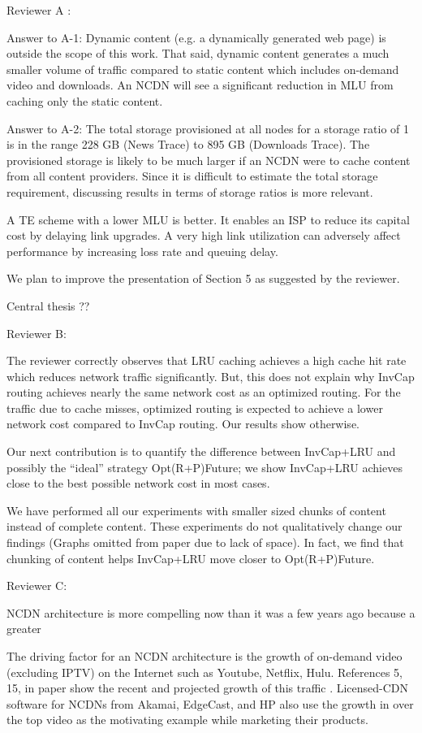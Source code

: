 Reviewer A :

Answer to A-1: Dynamic content (e.g. a dynamically generated web page) is outside the scope of this work. That said,  dynamic content  generates a much smaller volume of traffic compared to static content which includes on-demand video and downloads. An NCDN will see a significant reduction in MLU from caching only the static content.

Answer to A-2: The total storage provisioned at all nodes for a storage ratio of 1 is in the range 228 GB (News Trace) to  895 GB (Downloads Trace). The provisioned storage is likely to be much larger if an NCDN were to cache  content from all content providers. Since it is difficult to estimate the total storage requirement, discussing results in terms of storage ratios is more relevant.

A TE scheme with a lower MLU is better. It enables an ISP to reduce its capital cost by delaying link upgrades. A very high link utilization can adversely affect performance by increasing loss rate and queuing delay.

We plan to improve the presentation of Section 5 as suggested by the reviewer.

Central thesis ??

Reviewer B:

The reviewer correctly observes that LRU caching achieves a high cache hit rate which reduces network traffic significantly. But, this does not explain why InvCap routing achieves nearly the same network cost as an optimized routing.  For the traffic due to cache misses,  optimized routing is expected to achieve a lower network cost compared to InvCap routing. Our results show otherwise.  

Our next contribution is to quantify the difference between InvCap+LRU and possibly the ``ideal'' strategy Opt(R+P)Future; we show InvCap+LRU achieves close to the best possible network cost in most cases.

We have performed all our experiments with smaller sized chunks of content  instead of complete content. These experiments do not qualitatively change our findings (Graphs omitted from paper due to lack of space). In fact, we find that chunking of content  helps InvCap+LRU move closer to Opt(R+P)Future.


Reviewer C:

NCDN architecture is more compelling now than it was a few years ago because a greater 


The driving factor for an NCDN architecture is the growth of on-demand video (excluding IPTV) on the Internet such as Youtube, Netflix, Hulu. References 5, 15,  in paper show the recent and projected growth of this traffic . Licensed-CDN software for NCDNs from Akamai, EdgeCast, and HP also use the growth in over the top video as the motivating example while marketing their products.

